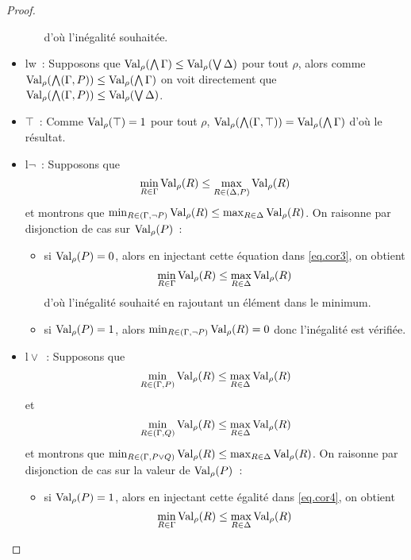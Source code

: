 \begin{proof}
\begin{itemize}
\begin{itemize}
      d'où l'inégalité souhaitée.
    \end{itemize}
  \item lw~: Supposons que
    $\operatorname{Val}_\rho(\bigwedge \Gamma) \leq \operatorname{Val}_\rho(\bigvee \Delta)$ pour tout
    $\rho$, alors comme
    $\operatorname{Val}_\rho(\bigwedge (\Gamma, P)) \leq \operatorname{Val}_\rho(\bigwedge \Gamma)$ on voit
    directement que
    $\operatorname{Val}_\rho(\bigwedge(\Gamma,P)) \leq \operatorname{Val}_\rho(\bigvee\Delta)$.
  \item $\top$~: Comme $\operatorname{Val}_\rho(\top) = 1$ pour tout $\rho$,
    $\operatorname{Val}_\rho(\bigwedge(\Gamma,\top)) = \operatorname{Val}_\rho(\bigwedge \Gamma)$ d'où le
    résultat.
  \item $\mathrm l\lnot$~: Supposons que
    \begin{equation}\label{eq.cor3}
      \min_{R \in \Gamma} \operatorname{Val}_\rho(R) \leq \max_{R \in (\Delta, P)} \operatorname{Val}_\rho(R)
    \end{equation}
    et montrons que
    $\min_{R \in (\Gamma, \lnot P)} \operatorname{Val}_\rho(R) \leq
    \max_{R \in \Delta} \operatorname{Val}_\rho(R)$. On raisonne par disjonction de cas sur
    $\operatorname{Val}_\rho(P)$~:
    \begin{itemize}
    \item si $\operatorname{Val}_\rho(P) = 0$, alors en injectant cette équation dans
      \ref{eq.cor3}, on obtient
      \[\min_{R \in \Gamma} \operatorname{Val}_\rho(R) \leq \max_{R \in \Delta} \operatorname{Val}_\rho(R)\]
      d'où l'inégalité souhaité en rajoutant un élément dans le minimum.
    \item si $\operatorname{Val}_\rho(P) = 1$, alors
      $\min_{R \in (\Gamma, \lnot P)} \operatorname{Val}_\rho(R) = 0$ donc l'inégalité est
      vérifiée.
    \end{itemize}
  \item $\mathrm l\lor$~: Supposons que
    \begin{equation}\label{eq.cor4}
      \min_{R \in (\Gamma, P)} \operatorname{Val}_\rho(R) \leq \max_{R \in \Delta} \operatorname{Val}_\rho(R)
    \end{equation}
    et
    \begin{equation}\label{eq.cor5}
      \min_{R \in (\Gamma, Q)} \operatorname{Val}_\rho(R) \leq \max_{R \in \Delta} \operatorname{Val}_\rho(R)
    \end{equation}
    et montrons que
    $\min_{R \in (\Gamma, P \lor Q)} \operatorname{Val}_\rho(R) \leq \max_{R \in \Delta} \operatorname{Val}_\rho(R)$.
    On raisonne par disjonction de cas sur la valeur de $\operatorname{Val}_\rho(P)$~:
    \begin{itemize}
    \item si $\operatorname{Val}_\rho(P) = 1$, alors en injectant cette égalité dans
      \ref{eq.cor4}, on obtient
      \[\min_{R \in \Gamma} \operatorname{Val}_\rho(R) \leq \max_{R \in \Delta} \operatorname{Val}_\rho(R)\]

\end{itemize}
\end{itemize}
\end{proof}
